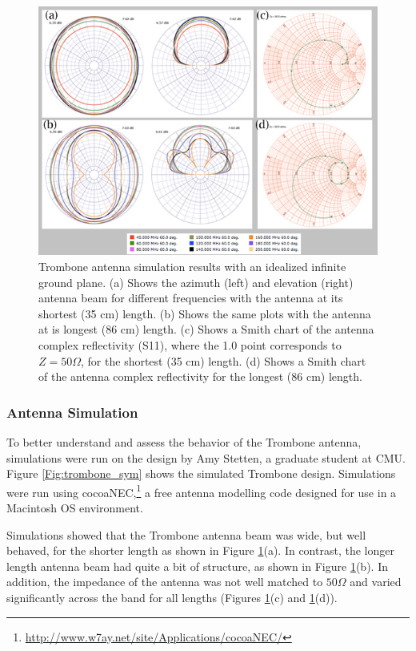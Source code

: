 \begin{figure}[htb]
\begin{center}
\includegraphics[width=0.95\linewidth]{SCIHI_system/figures/trombone_no_gp.jpg}
\caption{Trombone antenna simulation results with an idealized infinite ground plane. (a) Shows the azimuth (left) and elevation (right) antenna beam for different frequencies with the antenna at its shortest (35 cm) length. (b) Shows the same plots with the antenna at is longest (86 cm) length. (c) Shows a Smith chart of the antenna complex reflectivity (S11), where the 1.0 point corresponds to $Z = 50 \Omega$, for the shortest (35 cm) length. (d) Shows a Smith chart of the antenna complex reflectivity for the longest (86 cm) length. }
\label{Fig:trsym_nogp}
\end{center}
\end{figure}

\subsubsection{Antenna Simulation}

To better understand and assess the behavior of the Trombone antenna, simulations were run on the design by Amy Stetten, a graduate student at CMU. Figure \ref{Fig:trombone_sym} shows the simulated Trombone design. Simulations were run using cocoaNEC,\footnote{\url{http://www.w7ay.net/site/Applications/cocoaNEC/}} a free antenna modelling code designed for use in a Macintosh OS environment. 

Simulations showed that the Trombone antenna beam was wide, but well behaved, for the shorter length as shown in Figure \ref{Fig:trsym_nogp}(a). In contrast, the longer length antenna beam had quite a bit of structure, as shown in Figure \ref{Fig:trsym_nogp}(b). In addition, the impedance of the antenna was not well matched to $50 \Omega$ and varied significantly across the band for all lengths (Figures \ref{Fig:trsym_nogp}(c) and \ref{Fig:trsym_nogp}(d)). 

